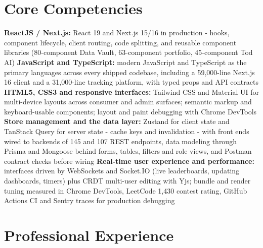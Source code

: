\documentclass[11pt,a4paper,sans]{moderncv}
\begin{document}
\section{Core Competencies}
\vspace{1pt}
\raggedright
\textbf{ReactJS / Next.js:} React 19 and Next.js 15/16 in production - hooks, component lifecycle, client routing, code splitting, and reusable component libraries (80-component Data Vault, 63-component portfolio, 45-component Tod AI) \textbar{}
\textbf{JavaScript and TypeScript:} modern JavaScript and TypeScript as the primary languages across every shipped codebase, including a 59,000-line Next.js 16 client and a 31,000-line tracking platform, with typed props and API contracts \textbar{}
\textbf{HTML5, CSS3 and responsive interfaces:} Tailwind CSS and Material UI for multi-device layouts across consumer and admin surfaces; semantic markup and keyboard-usable components; layout and paint debugging with Chrome DevTools \textbar{}
\textbf{Store management and the data layer:} Zustand for client state and TanStack Query for server state - cache keys and invalidation - with front ends wired to backends of 145 and 107 REST endpoints, data modeling through Prisma and Mongoose behind forms, tables, filters and role views, and Postman contract checks before wiring \textbar{}
\textbf{Real-time user experience and performance:} interfaces driven by WebSockets and Socket.IO (live leaderboards, updating dashboards, timers) plus CRDT multi-user editing with Yjs; bundle and render tuning measured in Chrome DevTools, LeetCode 1,430 contest rating, GitHub Actions CI and Sentry traces for production debugging
\par\normalfont


\section{Professional Experience}
\vspace{3pt}
\end{document}
